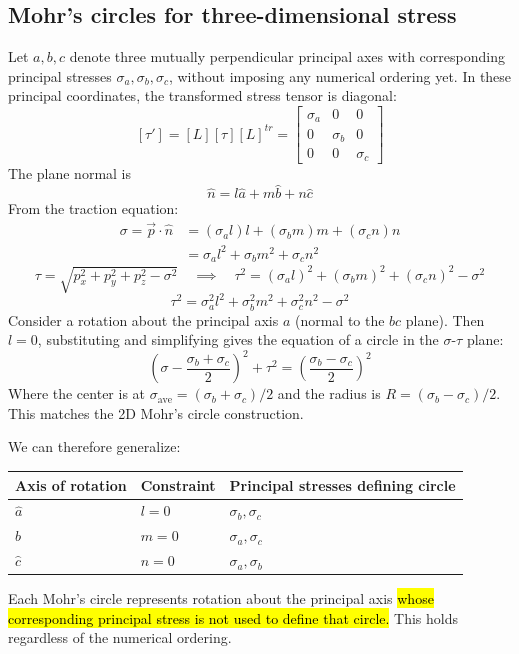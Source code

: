 ﻿\documentclass[12pt]{article}
\begin{document}
\subsection*{Mohr's circles for three-dimensional stress}
Let $a,b,c$ denote three mutually perpendicular principal axes with corresponding principal stresses $\sigma_a,\sigma_b,\sigma_c$, without imposing any numerical ordering yet. In these principal coordinates, the transformed stress tensor is diagonal:
\[
[\tau']=[L][\tau][L]^{tr}=
\begin{bmatrix}
\sigma_a&0&0\\
0&\sigma_b&0\\
0&0&\sigma_c
\end{bmatrix}
\]
The plane normal is
\[
\hat n=l\hat a+m\hat b+n\hat c
\]
From the traction equation:
\[\begin{aligned}
\sigma=\vec p\cdot\hat n &= (\sigma_a l)l+(\sigma_b m)m+(\sigma_c n)n\\
&= \sigma_al^2+\sigma_bm^2+\sigma_cn^2
\end{aligned}
\]
\[
\tau=\sqrt{p_x^2+p_y^2+p_z^2-\sigma^2}
\quad\implies\quad 
\tau^2=(\sigma_a l)^2+(\sigma_b m)^2+(\sigma_c n)^2-\sigma^2
\]
\[
\tau^2=\sigma_a^2l^2+\sigma_b^2m^2+\sigma_c^2n^2-\sigma^2
\]
Consider a rotation about the principal axis $a$ (normal to the $bc$ plane). Then $l=0$, substituting and simplifying gives the equation of a circle in the $\sigma$-$\tau$ plane:
\[
\boxed{
\left(\sigma-\frac{\sigma_b+\sigma_c}{2}\right)^2
+\tau^2
=\left(\frac{\sigma_b-\sigma_c}{2}\right)^2
}
\]
Where the center is at $\sigma_{\mathrm{ave}}=(\sigma_b+\sigma_c)/2$ and the radius is $R=(\sigma_b-\sigma_c)/2$. This matches the 2D Mohr's circle construction.

We can therefore generalize:
\begin{center}
\renewcommand{\arraystretch}{1.5}
\begin{tabular}{l l l}
\hline
\textbf{Axis of rotation} & \textbf{Constraint} & \textbf{Principal stresses defining circle} \\
\hline
$\hat{a}$ & $l=0$ & $\sigma_b,\sigma_c$ \\
$\hat{b}$ & $m=0$ & $\sigma_a,\sigma_c$ \\
$\hat{c}$ & $n=0$ & $\sigma_a,\sigma_b$ \\
\hline
\end{tabular}
\end{center}
Each Mohr's circle represents rotation about the principal axis \hl{whose corresponding principal stress is not used to define that circle.} This holds regardless of the numerical ordering.
\end{document}
